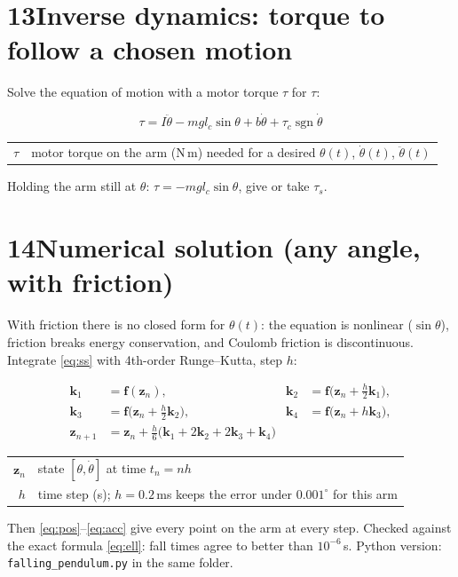 \documentclass[11pt]{article}
\makeatletter
\newcommand{\sgn}{\operatorname{sgn}}
\newcommand{\where}[1]{\par\vspace{-2pt}{\small\color{muted}\textit{where}}\par\vspace{-2pt}
  {\small\renewcommand{\arraystretch}{1.08}\begin{tabular}{@{}>{$}r<{$}@{\;\;}l@{}}#1\end{tabular}}}
\makeatother
\begin{document}
\section*{13\quad Inverse dynamics: torque to follow a chosen motion}
Solve the equation of motion with a motor torque $\tau$ for $\tau$:
\begin{result}
\begin{equation}
\tau=I\ddot\theta-m g l_c\sin\theta+b\dot\theta+\tau_c\sgn\dot\theta
\end{equation}
\where{\tau & motor torque on the arm (N\,m) needed for a desired $\theta(t)$, $\dot\theta(t)$, $\ddot\theta(t)$}
\end{result}
Holding the arm still at $\theta$: $\tau=-m g l_c\sin\theta$, give or take $\tau_s$.

\section*{14\quad Numerical solution (any angle, with friction)}
With friction there is no closed form for $\theta(t)$: the equation is nonlinear ($\sin\theta$), friction breaks energy conservation, and Coulomb friction is discontinuous. Integrate \eqref{eq:ss} with 4th-order Runge--Kutta, step $h$:
\begin{result}
\begin{align}
\bm k_1&=\bm f(\bm z_n), & \bm k_2&=\bm f\big(\bm z_n+\tfrac h2\bm k_1\big), \nonumber\\
\bm k_3&=\bm f\big(\bm z_n+\tfrac h2\bm k_2\big), & \bm k_4&=\bm f\big(\bm z_n+h\bm k_3\big), \\
\bm z_{n+1}&=\bm z_n+\tfrac h6\big(\bm k_1+2\bm k_2+2\bm k_3+\bm k_4\big) \nonumber
\end{align}
\where{\bm z_n & state $[\theta,\dot\theta]$ at time $t_n=nh$\\ h & time step (s); $h=0.2$\,ms keeps the error under $0.001^\circ$ for this arm}
\end{result}
Then \eqref{eq:pos}--\eqref{eq:acc} give every point on the arm at every step. Checked against the exact formula \eqref{eq:ell}: fall times agree to better than $10^{-6}$\,s. Python version: \texttt{falling\_pendulum.py} in the same folder.

\end{document}
